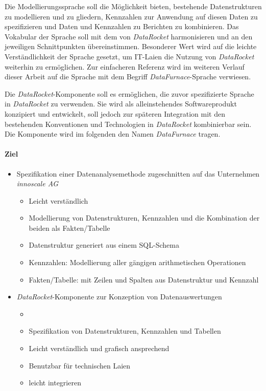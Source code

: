 \documentclass[
  language=german, %
  type=bachelor%
]{isthesis}
\begin{document}
\begin{content}
  Die Modellierungssprache soll die Möglichkeit bieten, bestehende
  Datenstrukturen zu modellieren und zu gliedern, Kennzahlen zur Anwendung auf
  diesen Daten zu spezifizieren und Daten und Kennzahlen zu Berichten zu
  kombinieren. Das Vokabular der Sprache soll mit dem von \textit{DataRocket}
  harmonisieren und an den jeweiligen Schnittpunkten übereinstimmen. Besonderer
  Wert wird auf die leichte Verständlichkeit der Sprache gesetzt, um IT-Laien
  die Nutzung von \textit{DataRocket} weiterhin zu ermöglichen. Zur
  einfacheren Referenz wird im weiteren Verlauf dieser Arbeit auf die Sprache
  mit dem Begriff \textit{DataFurnace}-Sprache  verwiesen.
  
  Die \textit{DataRocket}-Komponente soll es ermöglichen, die zuvor
  spezifizierte Sprache in \textit{DataRocket} zu verwenden. Sie wird als
  alleinstehendes Softwareprodukt konzipiert und entwickelt, soll jedoch zur
  späteren Integration mit den bestehenden Konventionen und Technologien in
  \textit{DataRocket} kombinierbar sein. Die Komponente wird im folgenden den
  Namen \textit{DataFurnace} tragen.


  \paragraph{Ziel}
  \begin{itemize}
    \item Spezifikation einer Datenanalysemethode zugeschnitten auf das
      Unternehmen \textit{innoscale AG}
      \begin{itemize}
        \item Leicht verständlich
        \item Modellierung von Datenstrukturen, Kennzahlen und die Kombination der
          beiden als Fakten/Tabelle
        \item Datenstruktur generiert aus einem SQL-Schema
        \item Kennzahlen: Modellierung aller gängigen arithmetischen Operationen
        \item Fakten/Tabelle: mit Zeilen und Spalten aus Datenstruktur und Kennzahl 
      \end{itemize}
    \item \textit{DataRocket}-Komponente zur Konzeption von Datenauswertungen
      \begin{itemize}
        \item {}
        \item Spezifikation von Datenstrukturen, Kennzahlen und Tabellen
        \item Leicht verständlich und grafisch ansprechend
        \item Benutzbar für technischen Laien
        \item leicht integrieren
      \end{itemize}
  \end{itemize}


\end{content}
\end{document}
